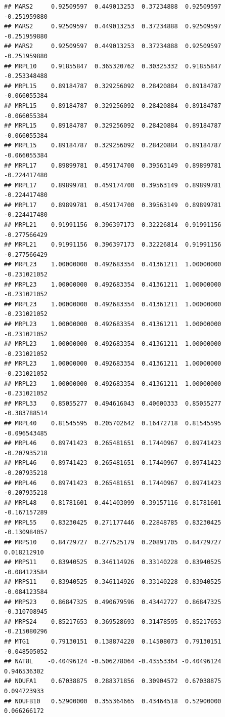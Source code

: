 \documentclass[
]{article}
\begin{document}
\begin{verbatim}
## MARS2     0.92509597  0.449013253  0.37234888  0.92509597 -0.251959880
## MARS2     0.92509597  0.449013253  0.37234888  0.92509597 -0.251959880
## MARS2     0.92509597  0.449013253  0.37234888  0.92509597 -0.251959880
## MRPL10    0.91855847  0.365320762  0.30325332  0.91855847 -0.253348488
## MRPL15    0.89184787  0.329256092  0.28420884  0.89184787 -0.066055384
## MRPL15    0.89184787  0.329256092  0.28420884  0.89184787 -0.066055384
## MRPL15    0.89184787  0.329256092  0.28420884  0.89184787 -0.066055384
## MRPL15    0.89184787  0.329256092  0.28420884  0.89184787 -0.066055384
## MRPL17    0.89899781  0.459174700  0.39563149  0.89899781 -0.224417480
## MRPL17    0.89899781  0.459174700  0.39563149  0.89899781 -0.224417480
## MRPL17    0.89899781  0.459174700  0.39563149  0.89899781 -0.224417480
## MRPL21    0.91991156  0.396397173  0.32226814  0.91991156 -0.277566429
## MRPL21    0.91991156  0.396397173  0.32226814  0.91991156 -0.277566429
## MRPL23    1.00000000  0.492683354  0.41361211  1.00000000 -0.231021052
## MRPL23    1.00000000  0.492683354  0.41361211  1.00000000 -0.231021052
## MRPL23    1.00000000  0.492683354  0.41361211  1.00000000 -0.231021052
## MRPL23    1.00000000  0.492683354  0.41361211  1.00000000 -0.231021052
## MRPL23    1.00000000  0.492683354  0.41361211  1.00000000 -0.231021052
## MRPL23    1.00000000  0.492683354  0.41361211  1.00000000 -0.231021052
## MRPL23    1.00000000  0.492683354  0.41361211  1.00000000 -0.231021052
## MRPL33    0.85055277  0.494616043  0.40600333  0.85055277 -0.383788514
## MRPL40    0.81545595  0.205702642  0.16472718  0.81545595 -0.096543485
## MRPL46    0.89741423  0.265481651  0.17440967  0.89741423 -0.207935218
## MRPL46    0.89741423  0.265481651  0.17440967  0.89741423 -0.207935218
## MRPL46    0.89741423  0.265481651  0.17440967  0.89741423 -0.207935218
## MRPL48    0.81781601  0.441403099  0.39157116  0.81781601 -0.167157289
## MRPL55    0.83230425  0.271177446  0.22848785  0.83230425 -0.130984057
## MRPS10    0.84729727  0.277525179  0.20891705  0.84729727  0.018212910
## MRPS11    0.83940525  0.346114926  0.33140228  0.83940525 -0.084123584
## MRPS11    0.83940525  0.346114926  0.33140228  0.83940525 -0.084123584
## MRPS23    0.86847325  0.490679596  0.43442727  0.86847325 -0.310708945
## MRPS24    0.85217653  0.369528693  0.31478595  0.85217653 -0.215080296
## MTG1      0.79130151  0.138874220  0.14508073  0.79130151 -0.048505052
## NAT8L    -0.40496124 -0.506278064 -0.43553364 -0.40496124  0.946536302
## NDUFA1    0.67038875  0.288371856  0.30904572  0.67038875  0.094723933
## NDUFB10   0.52900000  0.355364665  0.43464518  0.52900000  0.066266172

\end{verbatim}
\end{document}
